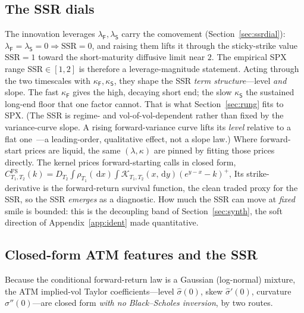 \documentclass[11pt]{article}
\newcommand{\cK}{\mathcal{K}}
\newcommand{\SSR}{\mathrm{SSR}}
\newcommand{\dd}{\,\mathrm{d}}
\begin{document}
\subsection{The SSR dials}
The innovation leverages $\lambda_{\mathsf{F}},\lambda_{\mathsf{S}}$ carry the comovement (Section~\ref{sec:ssrdial}):
$\lambda_{\mathsf{F}}=\lambda_{\mathsf{S}}=0\Rightarrow\SSR=0$, and raising them lifts it through the sticky-strike value $\SSR=1$
toward the short-maturity diffusive limit near $2$. The empirical SPX range
$\SSR\in[1,2]$ is therefore a leverage-magnitude statement. Acting through the two timescales with
$\kappa_{\mathsf{F}},\kappa_{\mathsf{S}}$, they shape
the SSR \emph{term structure}---level \emph{and} slope. The fast $\kappa_{\mathsf{F}}$ gives the
high, decaying short end; the slow $\kappa_{\mathsf{S}}$ the sustained long-end floor that one
factor cannot.
That is what Section~\ref{sec:rung} fits to SPX. (The SSR is regime- and vol-of-vol-dependent
rather than fixed by the variance-curve slope. A rising forward-variance curve lifts its
\emph{level} relative to a flat one~\cite{frizgatheral2024}---a leading-order, qualitative
effect, not a slope law.) Where forward-start prices are liquid, the same $(\lambda,\kappa)$ are
pinned by fitting those prices directly. The kernel prices forward-starting calls in closed form,
$C^{\mathrm{FS}}_{T_1,T_2}(k)=D_{T_2}\int\rho_{T_1}(\dd x)\int\cK_{T_1,T_2}(x,\dd y)(e^{y-x}-k)^+$,
Its strike-derivative is the forward-return survival function, the clean traded proxy for the
SSR, so the SSR \emph{emerges} as a diagnostic. How much the SSR can move at \emph{fixed} smile is
bounded: this is the decoupling band of Section~\ref{sec:synth}, the soft direction of
Appendix~\ref{app:ident} made quantitative.

\subsection{Closed-form ATM features and the SSR}
\label{sec:atm-closedform}
Because the conditional forward-return law is a Gaussian (log-normal) mixture, the ATM
implied-vol Taylor coefficients---level $\hat\sigma(0)$, skew $\hat\sigma'(0)$, curvature
$\hat\sigma''(0)$---are closed form \emph{with no Black--Scholes inversion}, by two routes.
\end{document}
